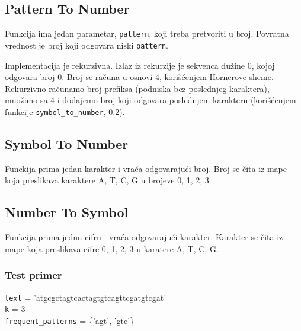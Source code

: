  

\subsection{Pattern To Number}
\label{patternToNumber}

Funkcija ima jedan parametar, \texttt{pattern}, koji treba pretvoriti u broj. Povratna vrednost je broj koji odgovara niski \texttt{pattern}.

Implementacija je rekurzivna. Izlaz iz rekurzije je sekvenca dužine 0, kojoj odgovara broj 0. Broj se računa u osnovi 4, korišćenjem Hornerove sheme. Rekurzivno računamo broj prefiksa (podniska bez poslednjeg karaktera), množimo sa 4 i dodajemo broj koji odgovara poslednjem karakteru (korišćenjem funkcije \texttt{symbol\_to\_number}, \ref{symbolToNumber}).





\subsection{Symbol To Number}
\label{symbolToNumber}

Funckija prima jedan karakter i vraća odgovarajući broj. Broj se čita iz mape koja preslikava karaktere A, T, C, G u brojeve 0, 1, 2, 3.



\subsection{Number To Symbol}
\label{numberToSymbol}

Funkcija prima jednu cifru i vraća odgovarajući karakter. Karakter se čita iz mape koja preslikava cifre 0, 1, 2, 3 u karatere A, T, C, G.




\subsubsection{Test primer}
\noindent\texttt{text} = 'atgcgctagtcactagtgtcagttcgatgtcgat'
\\\texttt{k} = 3
\\\texttt{frequent\_patterns} = \{'agt', 'gtc'\}


